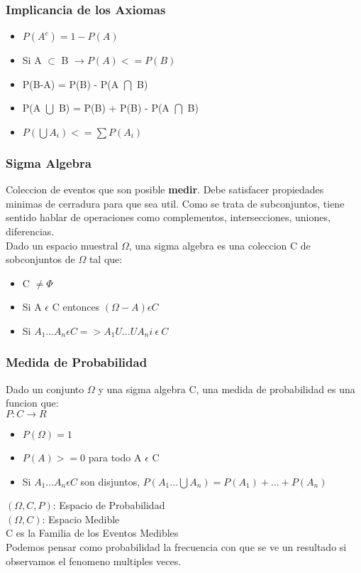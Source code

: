 \subsubsection{Implicancia de los Axiomas}
\begin{itemize}
\item $P(A^c) = 1 - P(A)$
\item Si A $\subset$ B $\rightarrow P(A) <= P(B)$
\item P(B-A) = P(B) - P(A $\bigcap$ B)
\item P(A $\bigcup$ B) = P(B) + P(B) - P(A $\bigcap$ B)
\item $P(\bigcup A_i) <= \sum P(A_i)$
\end{itemize}

\subsubsection{Sigma Algebra}
Coleccion de eventos que son posible \textbf{medir}. Debe satisfacer propiedades minimas de cerradura para que sea util. Como se trata de subconjuntos, tiene sentido hablar de operaciones como complementos, intersecciones, uniones, diferencias.\\
Dado un espacio muestral $\Omega$, una sigma algebra es una coleccion C de sobconjuntos de $\Omega$ tal que:
\begin{itemize}
\item C $\neq \Phi$
\item Si A $\epsilon$ C entonces $(\Omega - A) \epsilon C$
\item Si $A_1 \ldots A_n \epsilon C => A_1 U \ldots U A_ni\ \epsilon\ C$ 
\end{itemize}

\subsubsection{Medida de Probabilidad}
Dado un conjunto $\Omega$ y una sigma algebra C, una medida de probabilidad es una funcion que:\\
$P: C \rightarrow R$

\begin{itemize}
\item $P(\Omega) = 1$
\item $P(A) >= 0$ para todo A $\epsilon$ C
\item Si $A_1 \ldots A_n \epsilon C$ son disjuntos, $P(A_1 \ldots \bigcup A_n) = P(A_1) + \ldots + P(A_n)$
\end{itemize}
$(\Omega, C, P)$: Espacio de Probabilidad\\
$(\Omega, C)$: Espacio Medible\\
C es la Familia de los Eventos Medibles\\
Podemos pensar como probabilidad la frecuencia con que se ve un resultado si observamos el fenomeno multiples veces.

